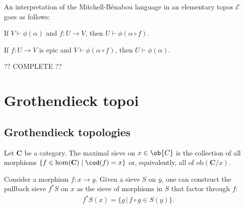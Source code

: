     An interpretation of the Mitchell-B\'enabou language in an elementary topos $\mathcal{E}$ goes as follows:

    \begin{property}[Monotonicity]
        If $V\vdash\phi(\alpha)$ and $f:U\rightarrow V$, then $U\vdash\phi(\alpha\circ f)$.
    \end{property}
    \begin{property}[Locality]
        If $f:U\rightarrow V$ is epic and $V\vdash\phi(\alpha\circ f)$, then $U\vdash\phi(\alpha)$.
    \end{property}

    ?? COMPLETE ??

\section{Grothendieck topoi}\label{section:grothendieck_topos}
\subsection{Grothendieck topologies}


    \begin{example}
        Let $\mathbf{C}$ be a category. The maximal sieve on $x\in\ob{C}$ is the collection of all morphisms $\{f\in\mathrm{hom}(\mathbf{C})\mid\cod(f)=x\}$ or, equivalently, all of $\mathrm{ob}(\mathbf{C}/x)$.
    \end{example}
    \begin{example}
        Consider a morphism $f:x\rightarrow y$. Given a sieve $S$ on $y$, one can construct the pullback sieve $f^*S$ on $x$ as the sieve of morphisms in $S$ that factor through $f$:
        \begin{gather}
            f^*S(x) = \big\{g\,\big\vert\,f\circ g\in S(y)\big\}.
        \end{gather}
    \end{example}

